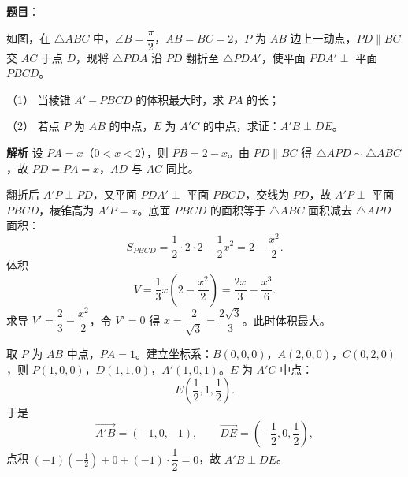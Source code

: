 \begin{answer}

\textbf{题目}：

如图，在 $\triangle ABC$ 中，$\angle B=\dfrac\pi2$，$AB=BC=2$，$P$ 为 $AB$ 边上一动点，$PD\parallel BC$ 交 $AC$ 于点 $D$，现将 $\triangle PDA$ 沿 $PD$ 翻折至 $\triangle PDA'$，使平面 $PDA'\perp$ 平面 $PBCD$。

（1） 当棱锥 $A'-PBCD$ 的体积最大时，求 $PA$ 的长；

（2） 若点 $P$ 为 $AB$ 的中点，$E$ 为 $A'C$ 的中点，求证：$A'B\perp DE$。
\nopagebreak[4]
\begin{center}\end{center}
\nopagebreak[4]
\textbf{解析}
设 $PA=x$（$0<x<2$），则 $PB=2-x$。由 $PD\parallel BC$ 得 $\triangle APD\sim\triangle ABC$，故 $PD=PA=x$，$AD$ 与 $AC$ 同比。

翻折后 $A'P\perp PD$，又平面 $PDA'\perp$ 平面 $PBCD$，交线为 $PD$，故 $A'P\perp$ 平面 $PBCD$，棱锥高为 $A'P=x$。底面 $PBCD$ 的面积等于 $\triangle ABC$ 面积减去 $\triangle APD$ 面积：
\nopagebreak[4]
\[S_{PBCD}=\frac12\cdot2\cdot2-\frac12x^2=2-\frac{x^2}2.\]
体积
\nopagebreak[4]
\[V=\frac13x\left(2-\frac{x^2}2\right)=\frac{2x}3-\frac{x^3}6.\]
求导 $V'=\dfrac23-\dfrac{x^2}2$，令 $V'=0$ 得 $x=\dfrac2{\sqrt3}=\dfrac{2\sqrt3}3$。此时体积最大。

取 $P$ 为 $AB$ 中点，$PA=1$。建立坐标系：$B(0,0,0)$，$A(2,0,0)$，$C(0,2,0)$，则 $P(1,0,0)$，$D(1,1,0)$，$A'(1,0,1)$。$E$ 为 $A'C$ 中点：
\nopagebreak[4]
\[E\left(\frac12,1,\frac12\right).\]
于是
\nopagebreak[4]
\[\overrightarrow{A'B}=(-1,0,-1),\qquad \overrightarrow{DE}=\left(-\frac12,0,\frac12\right),\]
点积 $(-1)\left(-\frac12\right)+0+(-1)\cdot\dfrac12=0$，故 $A'B\perp DE$。



\end{answer}
